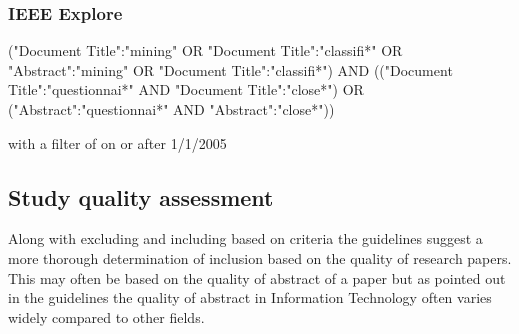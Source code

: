 \subsubsection{IEEE Explore}
\noindent
("Document Title":"mining" OR "Document Title":"classifi*" OR "Abstract":"mining"
OR "Document Title":"classifi*") AND (("Document Title":"questionnai*" AND "Document Title":"close*") OR ("Abstract":"questionnai*" AND "Abstract":"close*"))


\noindent
with a filter of on or after 1/1/2005


\subsection{Study quality assessment}

Along with excluding and including based on criteria the guidelines suggest a more thorough determination of inclusion based on the quality of research papers. This may often be based on the quality of abstract of a paper but as pointed out in the guidelines the quality of abstract in Information Technology often varies widely compared to other fields.







